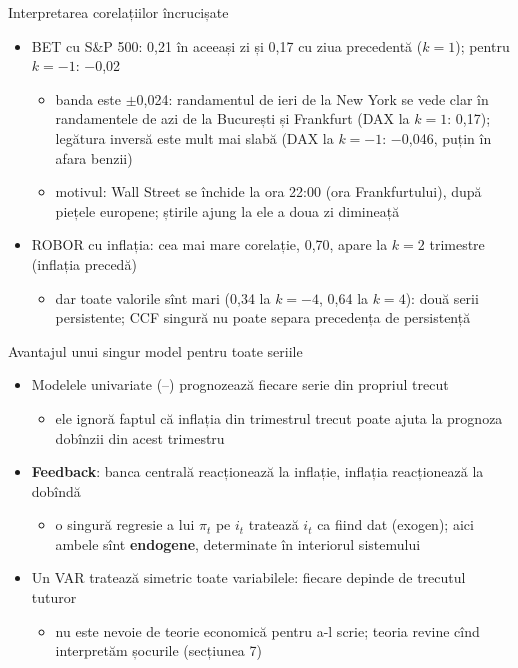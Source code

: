 \begin{frame}{Interpretarea corelațiilor încrucișate}
\itemsize{\small}
\begin{itemize}
    \item BET cu S\&P 500: 0{,}21 în aceeași zi și 0{,}17 cu ziua precedentă ($k = 1$); pentru $k = -1$: $-$0{,}02
    \begin{itemize}
        \item banda este $\pm$0{,}024: randamentul de ieri de la New York se vede clar în randamentele de azi de la București și Frankfurt (DAX la $k = 1$: 0{,}17); legătura inversă este mult mai slabă (DAX la $k = -1$: $-$0{,}046, puțin în afara benzii)
        \item motivul: Wall Street se închide la ora 22:00 (ora Frankfurtului), după piețele europene; știrile ajung la ele a doua zi dimineață
    \end{itemize}
    \item ROBOR cu inflația: cea mai mare corelație, 0{,}70, apare la $k = 2$ trimestre (inflația precedă)
    \begin{itemize}
        \item dar toate valorile sînt mari (0{,}34 la $k = -4$, 0{,}64 la $k = 4$): două serii persistente; CCF singură nu poate separa precedența de persistență
    \end{itemize}
\end{itemize}
\end{frame}

\begin{frame}{Avantajul unui singur model pentru toate seriile}
\itemsize{\small}
\begin{itemize}
    \item Modelele univariate (--) prognozează fiecare serie din propriul trecut
    \begin{itemize}
        \item ele ignoră faptul că inflația din trimestrul trecut poate ajuta la prognoza dobînzii din acest trimestru
    \end{itemize}
    \item \textbf{Feedback}: banca centrală reacționează la inflație, inflația reacționează la dobîndă
    \begin{itemize}
        \item o singură regresie a lui $\pi_t$ pe $i_t$ tratează $i_t$ ca fiind dat (exogen); aici ambele sînt \textbf{endogene}, determinate în interiorul sistemului
    \end{itemize}
    \item Un VAR tratează simetric toate variabilele: fiecare depinde de trecutul tuturor
    \begin{itemize}
        \item nu este nevoie de teorie economică pentru a-l scrie; teoria revine cînd interpretăm șocurile (secțiunea 7)
    \end{itemize}
\end{itemize}
\end{frame}

